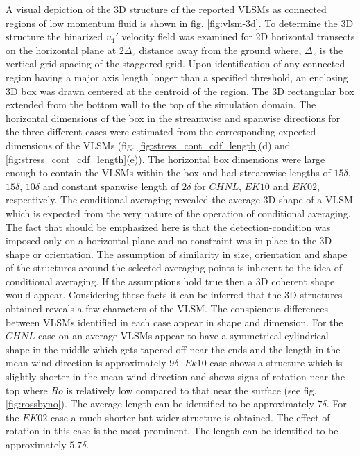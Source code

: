 \documentclass{svjour3}                     %
\begin{document}
A visual depiction of the 3D structure of the reported VLSMs as connected regions of low momentum fluid is shown in fig. \ref{fig:vlsm-3d}. To determine the 3D structure the binarized $u_{1}'$ velocity field was examined for 2D horizontal transects on the horizontal plane at $2\Delta_z$ distance away from the ground where, $\Delta_z$ is the vertical grid spacing of the staggered grid. Upon identification of any connected region having a major axis length longer than a specified threshold, an enclosing 3D box was drawn centered at the centroid of the region. The 3D rectangular box extended from the bottom wall to the top of the simulation domain. The horizontal dimensions of the box in the streamwise and spanwise directions for the three different cases were estimated from the corresponding expected dimensions of the VLSMs (fig. \ref{fig:stress_cont_cdf_length}(d) and \ref{fig:stress_cont_cdf_length}(e)). The horizontal box dimensions were large enough to contain the VLSMs within the box and had streamwise lengths of $15\delta$, $15\delta$, $10\delta$ and constant spanwise length of $2\delta$ for $CHNL$, $EK10$ and $EK02$, respectively.  The conditional averaging revealed the average 3D shape of a VLSM which is expected from the very nature of the operation of conditional averaging. The fact that should be emphasized here is that the detection-condition was imposed only on a horizontal plane and no constraint was in place to the 3D shape or orientation. The assumption of similarity in size, orientation and shape of the structures around the selected averaging points is inherent to the idea of conditional averaging. If the assumptions hold true then a 3D coherent shape would appear.  Considering these facts it can be inferred that the 3D structures obtained reveals a few characters of the VLSM.  The conspicuous differences between VLSMs identified in each case appear in shape and dimension. For the $CHNL$ case on an average VLSMs appear to have a symmetrical cylindrical shape in the middle which gets tapered off near the ends and the length in the mean wind direction is approximately $9\delta$. $Ek10$ case shows a structure which is slightly shorter in the mean wind direction and shows signs of rotation near the top where $Ro$ is relatively low compared to that near the surface (see fig. \ref{fig:rossbyno}). The average length can be identified to be approximately $7\delta$. For the $EK02$ case a much shorter but wider structure is obtained. The effect of rotation in this case is the most prominent. The length can be identified to be approximately $5.7\delta$. 
\end{document}

